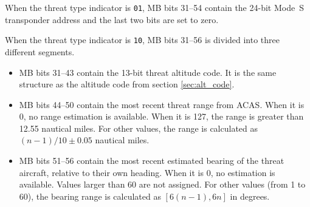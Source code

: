 When the threat type indicator is \texttt{01}, MB bits 31--54 contain the 24-bit Mode~S transponder address and the last two bits are set to zero.

When the threat type indicator is \texttt{10}, MB bits 31--56 is divided into three different segments.

\begin{itemize}
  \item MB bits 31--43 contain the 13-bit threat altitude code. It is the same structure as the altitude code from section \ref{sec:alt_code}.
  \item MB bits 44--50 contain the most recent threat range from ACAS. When it is 0, no range estimation is available. When it is 127, the range is greater than 12.55 nautical miles. For other values, the range is calculated as $(n-1) / 10 \pm 0.05$ nautical miles.
  \item MB bits 51--56 contain the most recent estimated bearing of the threat aircraft, relative to their own heading. When it is 0, no estimation is available. Values larger than 60 are not assigned. For other values (from 1 to 60), the bearing range is calculated as $[6(n-1), 6n]$ in degrees.
\end{itemize}
